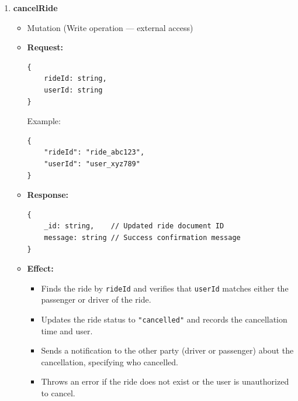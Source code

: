 \documentclass[a4paper,12pt]{article}
\begin{document}
\begin{enumerate}
    \item \textbf{cancelRide}
    \begin{itemize}
        \item Mutation (Write operation — external access)
        \item \textbf{Request:}
        \begin{verbatim}
{
    rideId: string,
    userId: string
}
        \end{verbatim}
        Example:
        \begin{verbatim}
{
    "rideId": "ride_abc123",
    "userId": "user_xyz789"
}
        \end{verbatim}
        \item \textbf{Response:}
        \begin{verbatim}
{
    _id: string,    // Updated ride document ID
    message: string // Success confirmation message
}
        \end{verbatim}
        \item \textbf{Effect:}
        \begin{itemize}
            \item Finds the ride by \texttt{rideId} and verifies that \texttt{userId} matches either the passenger or driver of the ride.
            \item Updates the ride status to \texttt{"cancelled"} and records the cancellation time and user.
            \item Sends a notification to the other party (driver or passenger) about the cancellation, specifying who cancelled.
            \item Throws an error if the ride does not exist or the user is unauthorized to cancel.
        \end{itemize}
    \end{itemize}


\end{enumerate}
\end{document}
